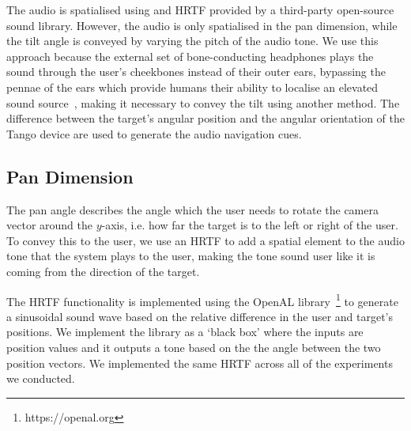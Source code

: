 \documentclass[format=sigconf, review=true, screen=true, anonymous=true]{acmart}
\begin{document}
The audio is spatialised using and HRTF provided by a third-party open-source sound library. However, the audio is only spatialised in the pan dimension, while the tilt angle is conveyed by varying the pitch of the audio tone. We use this approach because the external set of bone-conducting headphones plays the sound through the user's cheekbones instead of their outer ears, bypassing the pennae of the ears which provide humans their ability to localise an elevated sound source~\cite{roffler1968factors, algazi2001elevation}, making it necessary to convey the tilt using another method. The difference between the target's angular position and the angular orientation of the Tango device are used to generate the audio navigation cues. %

\subsection{Pan Dimension}

The pan angle describes the angle which the user needs to rotate the camera vector around the $y$-axis, i.e. how far the target is to the left or right of the user. To convey this to the user, we use an HRTF to add a spatial element to the audio tone that the system plays to the user, making the tone sound user like it is coming from the direction of the target. 

The HRTF functionality is implemented using the OpenAL library~\footnote{https://openal.org} to generate a sinusoidal sound wave based on the relative difference in the user and target's positions. We implement the library as a `black box' where the inputs are position values and it outputs a tone based on the the angle between the two position vectors. We implemented the same HRTF across all of the experiments we conducted.  
\end{document}
